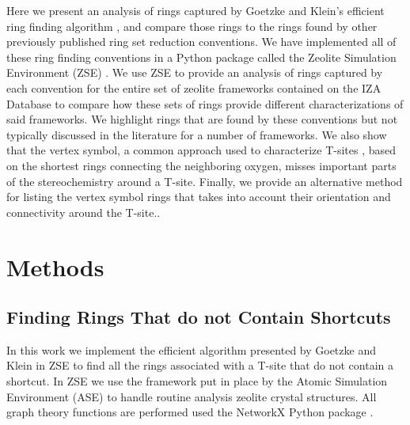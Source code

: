 \documentclass[preprint,numrefs,noinfo,sort&compress]{elsarticle}
\begin{document}
Here we present an analysis of rings captured by Goetzke and Klein's efficient ring finding algorithm \cite{goetzke-properties-1991}, and compare those rings to the rings found by other previously published ring set reduction conventions. We have implemented all of these ring finding conventions in a Python package called the Zeolite Simulation Environment (ZSE) \cite{crum-jtcrumzse-2022}. We use ZSE to provide an analysis of rings captured by each convention for the entire set of zeolite frameworks contained on the IZA Database \cite{baerlocher-database-nodate} to compare how these sets of rings provide different characterizations of said frameworks. We highlight rings that are found by these conventions but not typically discussed in the literature for a number of frameworks. We also show that the vertex symbol, a common approach used to characterize T-sites \cite{okeeffe-vertex-1997}, based on the shortest rings connecting the neighboring oxygen, misses important parts of the stereochemistry around a T-site. Finally, we provide an alternative method for listing the vertex symbol rings that takes into account their orientation and connectivity around the T-site.. 

\section{Methods}
\label{sec:orgd3de46b}

\subsection{Finding Rings That do not Contain Shortcuts \label{section:goetzke}}
\label{sec:org73ee410}

In this work we implement the efficient algorithm presented by Goetzke and Klein \cite{goetzke-properties-1991} in ZSE \cite{crum-jtcrumzse-2022} to find all the rings associated with a T-site that do not contain a shortcut. In ZSE we use the framework put in place by the Atomic Simulation Environment (ASE) \cite{hjorth-larsen-atomic-2017} to handle routine analysis zeolite crystal structures. All graph theory functions are performed used the NetworkX Python package \cite{hagberg-exploring-2008}. 
\end{document}
